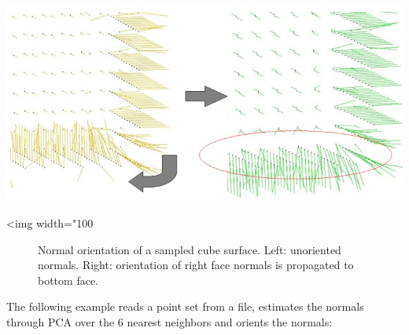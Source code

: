 \begin{center}
    \label{Point_set_processing_3-fig-mst_orient_normals}
    \begin{ccTexOnly}
        \includegraphics[width=1.0\textwidth]{Point_set_processing_3/mst_orient_normals} %
    \end{ccTexOnly}
    \begin{ccHtmlOnly}
        <img width="100%
    \end{ccHtmlOnly}
    \begin{figure}[h]
        \caption{Normal orientation of a sampled cube surface.
                 Left: unoriented normals.
                 Right: orientation of right face normals is propagated to bottom face.}
    \end{figure}
\end{center}

\ccExample

The following example reads a point set from a file, estimates the normals through PCA over the 6 nearest neighbors and orients the normals:


